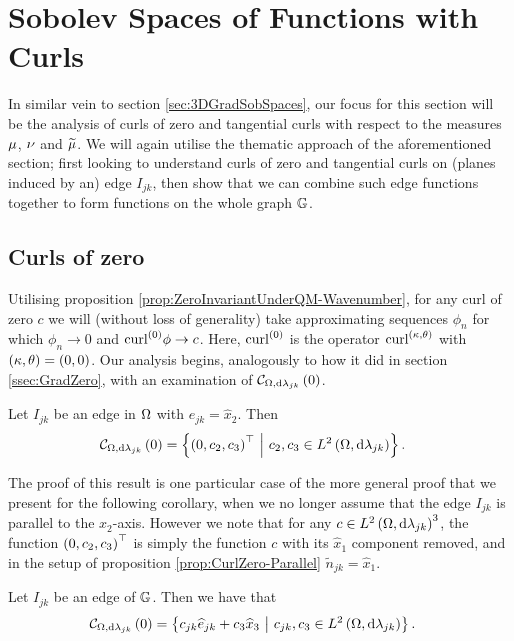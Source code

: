 \section{Sobolev Spaces of Functions with Curls} \label{sec:CC-CurlAnalysis}
In similar vein to section \ref{sec:3DGradSobSpaces}, our focus for this section will be the analysis of curls of zero and tangential curls with respect to the measures $\mu$, $\nu$ and $\widetilde{\mu}$.
We will again utilise the thematic approach of the aforementioned section; first looking to understand curls of zero and tangential curls on (planes induced by an) edge $I_{jk}$, then show that we can combine such edge functions together to form functions on the whole graph $\mathbb{G}$.

\subsection{Curls of zero} \label{ssec:CurlsOfZero}
Utilising proposition \ref{prop:ZeroInvariantUnderQM-Wavenumber}, for any curl of zero $c$ we will (without loss of generality) take approximating sequences $\phi_n$ for which $\phi_n\rightarrow0$ and $\mathrm{curl}_{}^{(0)}\phi\rightarrow c$.
Here, $\mathrm{curl}_{}^{(0)}$ is the operator $\mathrm{curl}_{}^{\left( \kappa, \theta \right)}$ with $\left( \kappa, \theta \right)=\left( 0,0 \right)$.
Our analysis begins, analogously to how it did in section \ref{ssec:GradZero}, with an examination of $\mathcal{C}_{ \Omega, \mathrm{d}\lambda_{jk}}\left( 0 \right)$.
\begin{prop} \label{prop:CurlZero-Parallel}
	Let $I_{jk}$ be an edge in $\Omega$ with $e_{jk} = \widehat{x}_2$.
	Then
	\begin{align*}
		\mathcal{C}_{ \Omega, \mathrm{d}\lambda_{jk}}\left( 0 \right) &= \left\{  \left( 0,c_2,c_3 \right)^\top \ \middle\vert \  c_2,c_3\in L^{2}\left( \Omega,\mathrm{d} \lambda_{jk} \right)  \right\}.
	\end{align*}
\end{prop}
The proof of this result is one particular case of the more general proof that we present for the following corollary, when we no longer assume that the edge $I_{jk}$ is parallel to the $x_2$-axis.
However we note that for any $c\in L^{2}\left( \Omega,\mathrm{d} \lambda_{jk} \right)^3$, the function $\left( 0,c_2,c_3 \right)^{\top}$ is simply the function $c$ with its $\widehat{x}_1$ component removed, and in the setup of proposition \ref{prop:CurlZero-Parallel} $\widetilde{n}_{jk} = \widehat{x}_1$.
\begin{cory} \label{cory:CurlZero-Rotated}
	Let $I_{jk}$ be an edge of $\mathbb{G}$.
	Then we have that
	\begin{align*}
		\mathcal{C}_{ \Omega, \mathrm{d}\lambda_{jk}}\left( 0 \right) &= \left\{  c_{jk}\widehat{e}_{jk} + c_3\widehat{x}_3 \ \middle\vert \  c_{jk},c_3\in L^{2}\left( \Omega,\mathrm{d} \lambda_{jk} \right)  \right\}.
	\end{align*}
\end{cory}
